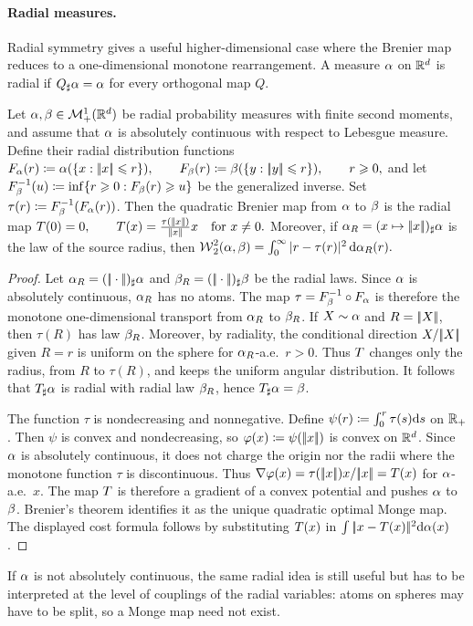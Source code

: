 \paragraph{Radial measures.}
Radial symmetry gives a useful higher-dimensional case where the Brenier map reduces to a one-dimensional monotone rearrangement. A measure $\alpha$ on $\mathbb{R}^d$ is radial if $Q_\sharp\alpha=\alpha$ for every orthogonal map $Q$.

\begin{prop}\label{prop-radial-transport}
Let $\alpha,\beta\in\mathcal{M}_+^1(\mathbb{R}^d)$ be radial probability measures with finite second moments, and assume that $\alpha$ is absolutely continuous with respect to Lebesgue measure. Define their radial distribution functions
\(F_\alpha(r)\coloneqq \alpha(\{x:|\!| x |\!|\leqslant r\}), \qquad F_\beta(r)\coloneqq \beta(\{y:|\!| y |\!|\leqslant r\}), \qquad r\geqslant0,\)
and let $F_\beta^{-1}(u)\coloneqq\inf\{r\geqslant0:F_\beta(r)\geqslant u\}$ be the generalized inverse.
Set $\tau(r)\coloneqq F_\beta^{-1}(F_\alpha(r))$.
Then the quadratic Brenier map from $\alpha$ to $\beta$ is the radial map
\(T(0)=0, \qquad T(x)=\frac{\tau(|\!| x |\!|)}{|\!| x |\!|}x \quad\text{for }x\neq0.\)
Moreover, if $\alpha_R=(x\mapsto|\!| x |\!|)_\sharp\alpha$ is the law of the source radius, then
\(\operatorname{\mathcal{W}}_2^2(\alpha,\beta) = \int_0^\infty |r-\tau(r)|^2\,\mathrm{d}\alpha_R(r).\)
\end{prop}
\begin{proof}
Let $\alpha_R=(|\!| \cdot |\!|)_\sharp\alpha$ and $\beta_R=(|\!| \cdot |\!|)_\sharp\beta$ be the radial laws. Since $\alpha$ is absolutely continuous, $\alpha_R$ has no atoms. The map $\tau=F_\beta^{-1}\circ F_\alpha$ is therefore the monotone one-dimensional transport from $\alpha_R$ to $\beta_R$. If $X\sim\alpha$ and $R=|\!| X |\!|$, then $\tau(R)$ has law $\beta_R$. Moreover, by radiality, the conditional direction $X/|\!| X |\!|$ given $R=r$ is uniform on the sphere for $\alpha_R$-a.e.\ $r>0$. Thus $T$ changes only the radius, from $R$ to $\tau(R)$, and keeps the uniform angular distribution. It follows that $T_\sharp\alpha$ is radial with radial law $\beta_R$, hence $T_\sharp\alpha=\beta$.

The function $\tau$ is nondecreasing and nonnegative. Define $\psi(r)\coloneqq\int_0^r\tau(s)\mathrm{d} s$ on $\mathbb{R}_+$. Then $\psi$ is convex and nondecreasing, so $\varphi(x)\coloneqq\psi(|\!| x |\!|)$ is convex on $\mathbb{R}^d$. Since $\alpha$ is absolutely continuous, it does not charge the origin nor the radii where the monotone function $\tau$ is discontinuous. Thus
$\nabla\varphi(x)=\tau(|\!| x |\!|)x/|\!| x |\!|=T(x)$ for $\alpha$-a.e.\ $x$.
The map $T$ is therefore a gradient of a convex potential and pushes $\alpha$ to $\beta$. Brenier's theorem identifies it as the unique quadratic optimal Monge map. The displayed cost formula follows by substituting $T(x)$ in $\int|\!| x-T(x) |\!|^2\mathrm{d}\alpha(x)$.
\end{proof}
If $\alpha$ is not absolutely continuous, the same radial idea is still useful but has to be interpreted at the level of couplings of the radial variables: atoms on spheres may have to be split, so a Monge map need not exist.

